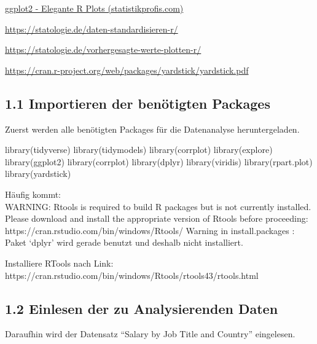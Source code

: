 \documentclass[
  letterpaper,
  DIV=11,
  numbers=noendperiod]{scrartcl}
\newenvironment{Shaded}{\begin{snugshade}}{\end{snugshade}}
\newcommand{\FunctionTok}[1]{\textcolor[rgb]{0.28,0.35,0.67}{#1}}
\newcommand{\NormalTok}[1]{\textcolor[rgb]{0.00,0.23,0.31}{#1}}
\begin{document}
\href{https://www.statistikprofis.com/post/ggplot}{ggplot2 - Elegante R
Plots (statistikprofis.com)}

\url{https://statologie.de/daten-standardisieren-r/}

\url{https://statologie.de/vorhergesagte-werte-plotten-r/}

\url{https://cran.r-project.org/web/packages/yardstick/yardstick.pdf}

\hypertarget{importieren-der-benuxf6tigten-packages}{%
\subsection{1.1 Importieren der benötigten
Packages}\label{importieren-der-benuxf6tigten-packages}}

Zuerst werden alle benötigten Packages für die Datenanalyse
heruntergeladen.

\begin{Shaded}
\begin{Highlighting}[]
\FunctionTok{library}\NormalTok{(tidyverse)}
\FunctionTok{library}\NormalTok{(tidymodels)}
\FunctionTok{library}\NormalTok{(corrplot)}
\FunctionTok{library}\NormalTok{(explore) }
\FunctionTok{library}\NormalTok{(ggplot2)}
\FunctionTok{library}\NormalTok{(corrplot)}
\FunctionTok{library}\NormalTok{(dplyr)}
\FunctionTok{library}\NormalTok{(viridis)}
\FunctionTok{library}\NormalTok{(rpart.plot)}
\FunctionTok{library}\NormalTok{(yardstick)}
\end{Highlighting}
\end{Shaded}

Häufig kommt:\\
WARNING: Rtools is required to build R packages but is not currently
installed. Please download and install the appropriate version of Rtools
before proceeding: https://cran.rstudio.com/bin/windows/Rtools/ Warning
in install.packages : Paket `dplyr' wird gerade benutzt und deshalb
nicht installiert.

Installiere RTools nach Link:
https://cran.rstudio.com/bin/windows/Rtools/rtools43/rtools.html

\hypertarget{einlesen-der-zu-analysierenden-daten}{%
\subsection{1.2 Einlesen der zu Analysierenden
Daten}\label{einlesen-der-zu-analysierenden-daten}}

Daraufhin wird der Datensatz ``Salary by Job Title and Country''
eingelesen.
\end{document}
